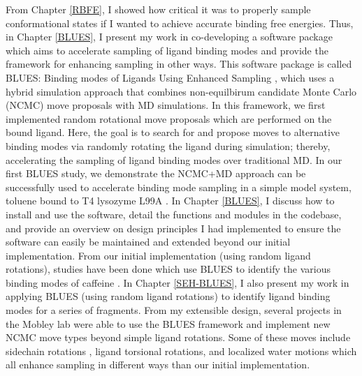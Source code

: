 From Chapter \ref{RBFE}, I showed how critical it was to properly sample conformational states if I wanted to achieve accurate binding free energies.
Thus, in Chapter \ref{BLUES}, I present my work in co-developing a software package which aims to accelerate sampling of ligand binding modes and provide the framework for enhancing sampling in other ways.
This software package is called BLUES: Binding modes of Ligands Using Enhanced Sampling \cite{BLUESgithub}, which uses a hybrid simulation approach that combines non-equilbirum candidate Monte Carlo (NCMC) \cite{ncmc_paper} move proposals with MD simulations.
In this framework, we first implemented random rotational move proposals which are performed on the bound ligand.
Here, the goal is to search for and propose moves to alternative binding modes via randomly rotating the ligand during simulation; thereby, accelerating the sampling of ligand binding modes over traditional MD.
In our first BLUES study, we demonstrate the NCMC+MD approach can be successfully used to accelerate binding mode sampling in a simple model system, toluene bound to T4 lysozyme L99A \cite{BLUESpaper}.
In Chapter \ref{BLUES}, I discuss how to install and use the software, detail the functions and modules in the codebase, and provide an overview on design principles I had implemented to ensure the software can easily be maintained and extended beyond our initial implementation.
From our initial implementation (using random ligand rotations), studies have been done which use BLUES to identify the various binding modes of caffeine \cite{BLUEScaffeine}.
In Chapter \ref{SEH-BLUES}, I also present my work in applying BLUES (using random ligand rotations) to identify ligand binding modes for a series of fragments.
From my extensible design, several projects in the Mobley lab were able to use the BLUES framework and implement new NCMC move types beyond simple ligand rotations.
Some of these moves include sidechain rotations \cite{burley2019enhancing}, ligand torsional rotations, and localized water motions which all enhance sampling in different ways than our initial implementation.

